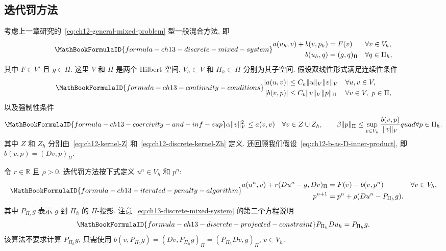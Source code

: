 \subsection{迭代罚方法}
\label{sec:ch13-iterated-penalty-method}
\setcounter{thmcount}{0}
\setcounter{equation}{0}

考虑上一章研究的~\eqref{eq:ch12-general-mixed-problem} 型一般混合方法, 即
\begin{equation}
\MathBookFormulaID{formula-ch13-discrete-mixed-system}
\label{eq:ch13-discrete-mixed-system}
\begin{aligned}
a(u_h,v)+b(v,p_h)&=F(v)&&\forall v\in V_h,\\
b(u_h,q)&=(g,q)_\Pi&&\forall q\in\Pi_h,
\end{aligned}
\end{equation}
其中 $F\in V'$ 且 $g\in\Pi$. 这里 $V$ 和 $\Pi$ 是两个 Hilbert 空间, $V_h\subset V$ 和 $\Pi_h\subset\Pi$ 分别为其子空间. 假设双线性形式满足连续性条件
\begin{equation}
\MathBookFormulaID{formula-ch13-continuity-conditions}
\label{eq:ch13-continuity-conditions}
\begin{aligned}
|a(u,v)|&\leq C_a\|u\|_V\|v\|_V&&\forall u,v\in V,\\
|b(v,p)|&\leq C_b\|v\|_V\|p\|_\Pi&&\forall v\in V,\ p\in\Pi,
\end{aligned}
\end{equation}
以及强制性条件
\begin{equation}
\MathBookFormulaID{formula-ch13-coercivity-and-inf-sup}
\label{eq:ch13-coercivity-and-inf-sup}
\alpha\|v\|_V^2\leq a(v,v)\quad\forall v\in Z\cup Z_h,
\qquad
\beta\|p\|_\Pi\leq
\sup_{v\in V_h}\frac{b(v,p)}{\|v\|_V}quad\forall p\in\Pi_h.
\end{equation}
其中 $Z$ 和 $Z_h$ 分别由~\eqref{eq:ch12-kernel-Z} 和~\eqref{eq:ch12-discrete-kernel-Zh} 定义. 还回顾我们假设~\eqref{eq:ch12-b-as-D-inner-product}, 即 $b(v,p)=(Dv,p)_\Pi$.

令 $r\in\mathbb R$ 且 $\rho>0$. 迭代罚方法按下式定义 $u^n\in V_h$ 和 $p^n$:
\begin{equation}
\MathBookFormulaID{formula-ch13-iterated-penalty-algorithm}
\label{eq:ch13-iterated-penalty-algorithm}
\begin{aligned}
a(u^n,v)+r(Du^n-g,Dv)_\Pi
&=F(v)-b(v,p^n)&&\forall v\in V_h,\\
p^{n+1}&=p^n+\rho(Du^n-P_{\Pi_h}g).
\end{aligned}
\end{equation}
其中 $P_{\Pi_h}g$ 表示 $g$ 到 $\Pi_h$ 的 $\Pi$-投影. 注意~\eqref{eq:ch13-discrete-mixed-system} 的第二个方程说明
\begin{equation}
\MathBookFormulaID{formula-ch13-discrete-projected-constraint}
\label{eq:ch13-discrete-projected-constraint}
P_{\Pi_h}Du_h=P_{\Pi_h}g.
\end{equation}
该算法不要求计算 $P_{\Pi_h}g$, 只需使用
$b(v,P_{\Pi_h}g)=(Dv,P_{\Pi_h}g)_\Pi=(P_{\Pi_h}Dv,g)_\Pi$, $v\in V_h$.

